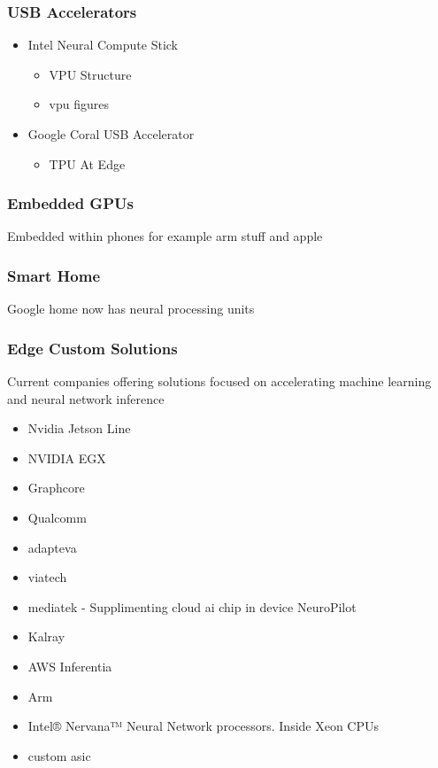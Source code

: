 \documentclass[12pt]{article}
\begin{document}
\subsubsection{USB Accelerators}
\begin{itemize}
\item
Intel Neural Compute Stick 
\begin{itemize}
\item
VPU Structure
\item
vpu figures
\end{itemize}
\item
Google Coral USB Accelerator
\begin{itemize}
\item
TPU At Edge

\end{itemize}
	

\end{itemize}

\subsubsection{Embedded GPUs}
Embedded within phones for example arm stuff and apple
\subsubsection{Smart Home}
Google home now has neural processing units
\subsubsection{Edge Custom Solutions}
Current companies offering solutions focused on accelerating machine learning and neural network inference
\begin{itemize}
\item
Nvidia Jetson Line
\item
NVIDIA EGX
\item
Graphcore
\item
Qualcomm
\item
adapteva
\item
viatech
\item
mediatek - Supplimenting cloud ai chip in device NeuroPilot
\item
Kalray
\item
AWS Inferentia
\item
Arm
\item
Intel® Nervana™ Neural Network processors. Inside Xeon CPUs
\item 
custom asic
\end{itemize}
\end{document}
